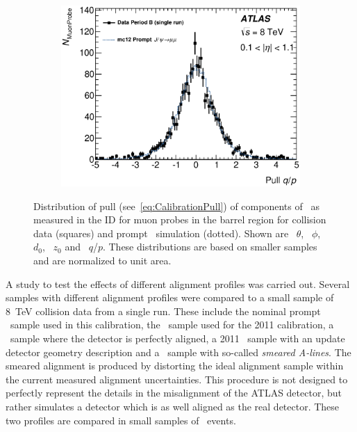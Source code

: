 \begin{figure}[htbp]
    \begin{subfigure}[b]{0.49\textwidth}
      \includegraphics[width=\textwidth]{PartCalibration2012/Plots/DiscrepancyStudy/Pull/h_pull_qoverp_Nominal.eps}
      \caption{} \label{fig:CalibrationPullPt}
    \end{subfigure}
    \caption{Distribution of pull (see~\ref{eq:CalibrationPull}) of components of \xsd\ as measured in the ID for muon probes in the barrel region for collision data (squares) and prompt \jpsi\ simulation (dotted). Shown are~ $\theta$,~ $\phi$,~ $d_{0}$,~ $z_{0}$ and~ $q$/$p$. These distributions are based on smaller samples and are normalized to unit area.}
  \label{fig:CalibrationPull}
\end{figure}

A study to test the effects of different alignment profiles was carried out. Several samples with different alignment profiles were compared to a small sample of \SI{8}{\TeV} collision data from a single run. These include the nominal prompt \jpsi\ sample used in this calibration, the \jpsi\ sample used for the 2011 calibration, a \ZMu\ sample where the detector is perfectly aligned, a 2011 \ZMu\ sample with an update detector geometry description and a \ZMu\ sample with so-called \emph{smeared A-lines}. The smeared alignment is produced by distorting the ideal alignment sample within the current measured alignment uncertainties. This procedure is not designed to perfectly represent the details in the misalignment of the ATLAS detector, but rather simulates a detector which is as well aligned as the real detector. These two profiles are compared in small samples of \ZMu\ events.


